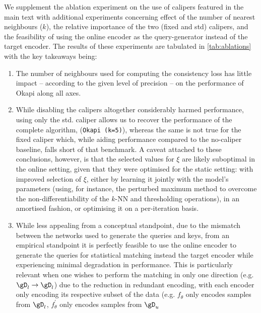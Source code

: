  We supplement the ablation experiment on the use of calipers featured in the main text with
 additional experiments concerning effect of the number of nearest neighbours ($k$), the relative
 importance of the two (fixed and std) calipers, and the feasibility of using the online encoder as
 the query-generator instead of the target encoder.
 The results of these experiments are tabulated in \ref{tab:ablations} with the key takeaways
 being: \begin{enumerate} 
     \item The number of neighbours used for computing the consistency loss
         has little impact -- according to the given level of precision -- on the performance of Okapi
        along all axes.
     \item While disabling the calipers altogether considerably harmed performance, using only the
         std. caliper allows us to recover the performance of the complete algorithm,
         (\texttt{Okapi (k=5)}), whereas the same is not true for the fixed caliper which, while
         aiding performance compared to the no-caliper baseline, falls short of that benchmark.
         A caveat attached to these conclusions, however, is that the selected values for $\xi$ are
         likely suboptimal in the online setting, given that they were optimised for the static
         setting: with improved selection of $\xi$, either by learning it jointly with the model's
         parameters (using, for instance, the perturbed maximum method \citep{berthet2020learning}
         to overcome the non-differentiability of the $k$-NN and thresholding operations), in an
         amortised fashion, or optimising it on a per-iteration basis.
    \item While less appealing from a conceptual standpoint, due to the mismatch between the
        networks used to generate the queries and keys, from an empirical standpoint it is
        perfectly feasible to use the online encoder to generate the queries for statistical
        matching instead the target encoder while experiencing minimal degradation in performance.
        This is particularly relevant when one wishes to perform the matching in only one direction
        (e.g.\ \( \gD_l \to \gD_l \)) due to the reduction in redundant encoding, with each encoder
        only encoding its respective subset of the data (e.g. $f_\theta$ only encodes samples from
        $\gD_l$, \( f_\theta^\prime \) only encodes samples from \( \gD_u \)
\end{enumerate}


